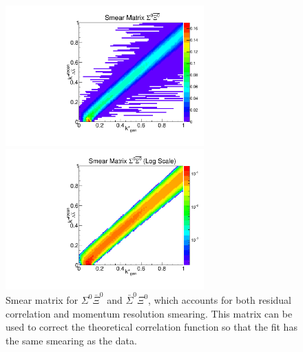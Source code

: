 \begin{figure}[h]
\begin{minipage}{18pc}
\includegraphics[width=18pc]{Figures/SmearMatrices/2016-7-19-SmearMatrixSigmaXi0NormLA.pdf}
\end{minipage}\hspace{2pc}
\begin{minipage}{18pc}
\includegraphics[width=18pc]{Figures/SmearMatrices/2016-7-19-SmearMatrixSigmaXi0NormLALog.pdf}
\end{minipage} 
\caption[Smear matrix -- $\Sigma^0\bar{\Xi}^0$ and $\bar{\Sigma}^0\Xi^0$]{
Smear matrix for $\Sigma^0\bar{\Xi}^0$ and $\bar{\Sigma}^0\Xi^0$, which accounts for both residual correlation and momentum resolution smearing. This matrix can be used to correct the theoretical correlation function so that the fit has the same smearing as the data.
}
\end{figure}


